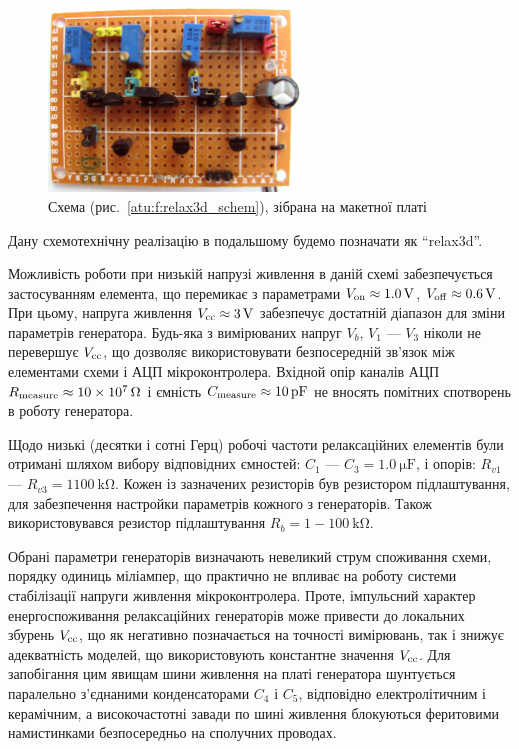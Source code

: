 \begin{figure}[htb!]
  \centerline{\includegraphics[width=0.6\textwidth]{p/relax3d_board.jpg} }
\caption{Схема (рис.~\ref{atu:f:relax3d_schem}), зібрана на макетної платі}
\label{atu:f:relax3d_board}
\end{figure}

Дану схемотехнічну реалізацію в подальшому будемо позначати
як ``relax3d''.


Можливість роботи при низькій напрузі живлення в даній
схемі забезпечується застосуванням елемента, що перемикає
з параметрами
$ V _\mathrm{on} \approx \SI{1.0}{\volt} $,
$ V _\mathrm{off} \approx \SI{0.6}{ \volt} $. При цьому, напруга живлення
$ V _\mathrm{cc} \approx \SI{3}{\volt} $ забезпечує достатній діапазон для зміни
параметрів генератора. Будь-яка з вимірюваних напруг
$ V_b $,
$ V_1 $ ---
$ V_3 $ ніколи не перевершує
$ V _\mathrm{cc} $, що дозволяє використовувати безпосередній зв'язок між
елементами схеми і АЦП мікроконтролера. Вхідной опір каналів АЦП
$ R _\mathrm{measure} \approx \SI{10e7}{\ohm} $ і ємність
$ C \Tidx{measure} \approx \SI{10}{\pico \farad} $ не вносять помітних спотворень в
роботу генератора.

Щодо низькі (десятки і сотні Герц) робочі частоти релаксаційних
елементів були отримані шляхом вибору відповідних ємностей:
$C_1 $ --- $ C_3 = \SI{1.0}{\micro \farad} $, і опорів:
$ R_{v1} $ --- $ R_{v3} = 1 \SI{100}{\kilo \ohm} $.
Кожен із зазначених резисторів був
резистором підлаштування, для забезпечення настройки параметрів кожного
з генераторів. Також використовувався
резистор підлаштування $ R_{b} = 1-\SI{100}{\kilo\ohm}$.

Обрані параметри генераторів визначають невеликий струм
споживання схеми, порядку одиниць міліампер, що практично
не впливає на роботу системи стабілізації напруги живлення
мікроконтролера. Проте, імпульсний характер енергоспоживання
релаксаційних генераторів може привести до локальних збурень
$ V _\mathrm{cc} $, що як негативно позначається на точності вимірювань,
так і знижує адекватність моделей, що використовують константне
значення
$ V _\mathrm{cc} $. Для запобігання цим явищам шини живлення на платі
генератора шунтується паралельно з'єднаними конденсаторами
$ C_4 $ і
$ C_5 $, відповідно електролітичним і керамічним, а високочастотні
завади по шині живлення блокуються феритовими намистинками
безпосередньо на сполучних проводах.


